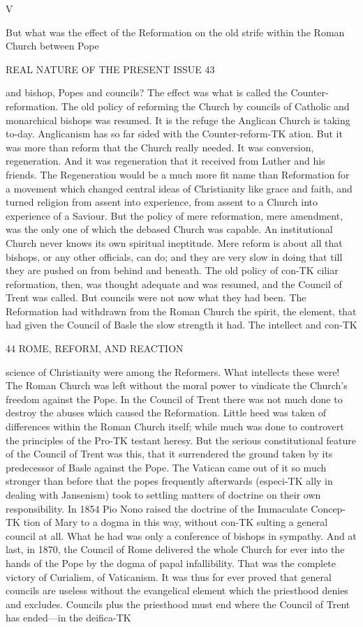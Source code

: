 \documentclass[12pt,a5paper,oneside]{book}
\begin{document}
V 

But what was the effect of the Reformation on the 
old strife within the Roman Church between Pope 



REAL NATURE OF THE PRESENT ISSUE 43 

and bishop, Popes and councils? The effect was 
what is called the Counter-reformation. The old 
policy of reforming the Church by councils of 
Catholic and monarchical bishops was resumed. It 
is the refuge the Anglican Church is taking to-day. 
Anglicanism has so far sided with the Counter-reform-TK
ation. But it was more than reform that the Church 
really needed. It was conversion, regeneration. And it 
was regeneration that it received from Luther and his 
friends. The Regeneration would be a much more 
fit name than Reformation for a movement which 
changed central ideas of Christianity like grace and 
faith, and turned religion from assent into experience, 
from assent to a Church into experience of a Saviour. 
But the policy of mere reformation, mere amendment, 
was the only one of which the debased Church was 
capable. An institutional Church never knows its 
own spiritual ineptitude. Mere reform is about all 
that bishops, or any other officials, can do; and they 
are very slow in doing that till they are pushed on 
from behind and beneath. The old policy of con-TK
ciliar reformation, then, was thought adequate and was 
resumed, and the Council of Trent was called. But 
councils were not now what they had been. The 
Reformation had withdrawn from the Roman Church 
the spirit, the element, that had given the Council of 
Basle the slow strength it had. The intellect and con-TK



44 ROME, REFORM, AND REACTION 

science of Christianity were among the Reformers. 
What intellects these were! The Roman Church was 
left without the moral power to vindicate the Church's 
freedom against the Pope. In the Council of Trent 
there was not much done to destroy the abuses which 
caused the Reformation. Little heed was taken of 
differences within the Roman Church itself; while 
much was done to controvert the principles of the Pro-TK
testant heresy. But the serious constitutional feature 
of the Council of Trent was this, that it surrendered 
the ground taken by its predecessor of Basle against the 
Pope. The Vatican came out of it so much stronger 
than before that the popes frequently afterwards (especi-TK
ally in dealing with Jansenism) took to settling matters 
of doctrine on their own responsibility. In 1854 Pio 
Nono raised the doctrine of the Immaculate Concep-TK
tion of Mary to a dogma in this way, without con-TK
sulting a general council at all. What he had was only 
a conference of bishops in sympathy. And at last, in 
1870, the Council of Rome delivered the whole 
Church for ever into the hands of the Pope by the 
dogma of papal infallibility. That was the complete 
victory of Curialism, of Vaticanism. It was thus for 
ever proved that general councils are useless without 
the evangelical element which the priesthood denies 
and excludes. Councils plus the priesthood must end 
where the Council of Trent has ended---in the deifica-TK
\end{document}
